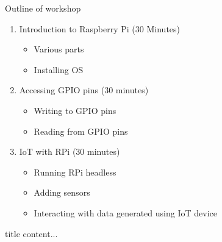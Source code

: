\begin{frame}{Outline of workshop}
	\begin{enumerate}
		\item Introduction to Raspberry Pi ($30$ Minutes)
		\begin{itemize}
			\item Various parts
			\item Installing OS
		\end{itemize}
		\item Accessing GPIO pins ($30$ minutes)
		\begin{itemize}
			\item Writing to GPIO pins
			\item Reading from GPIO pins
		\end{itemize}
		\item IoT with RPi ($30$ minutes)
		\begin{itemize}
			\item Running RPi headless 
			\item Adding sensors
			\item Interacting with data generated using IoT device
		\end{itemize}
	\end{enumerate}
\end{frame}

\begin{frame}{title}
	content...
\end{frame}